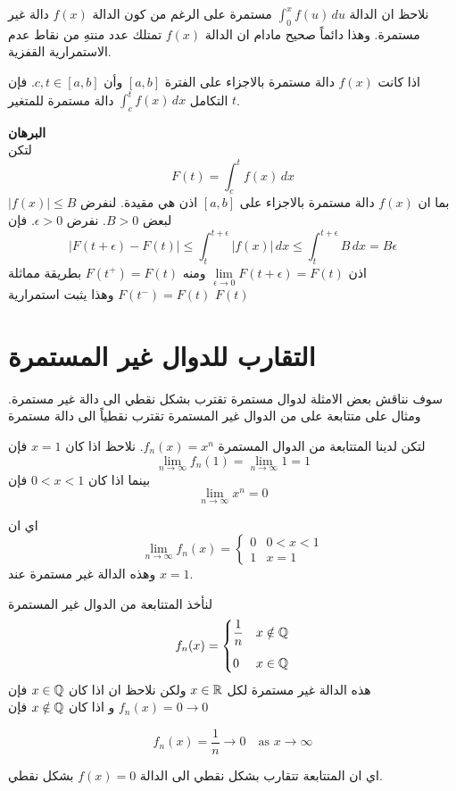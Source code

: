 \begin{note}
	نلاحظ ان الدالة $\int_{0}^{x} f(u)\, du$ مستمرة على الرغم من كون الدالة $f(x)$ دالة غير مستمرة. وهذا دائماً صحيح مادام ان الدالة $f(x)$ تمتلك عدد منتهِ من نقاط عدم الاستمرارية القفزية.
\end{note}

\begin{theorem}
	اذا كانت $f(x)$ دالة مستمرة  بالاجزاء على الفترة $[a, b]$ وأن $c,t\in [a,b]$. فإن التكامل
	 $\int_{c}^{t} f(x)\, dx$
	 دالة مستمرة للمتغير $t$. 
\end{theorem}
\noindent
\textbf{البرهان}\\
\noindent
لتكن
\[
F(t) = \int_{c}^{t} f(x)\, dx
\]
بما ان $f(x)$ دالة مستمرة بالاجزاء على $[a, b]$ اذن هي مقيدة. لنفرض $|f(x)| \leq B$ لبعض $B>0 $. نفرض $\epsilon > 0 $. فإن 
\[
|F(t+\epsilon) - F(t)| \leq \int_{t}^{t+\epsilon} |f(x)|\,dx \leq \int_{t}^{t+\epsilon} B\, dx=B\epsilon
\]
اذن 
$\lim\limits_{\epsilon\to0} F(t+\epsilon) = F(t)$ ومنه $F(t^+) = F(t)$ بطريقة مماثلة $F(t^-) =F(t)$ وهذا يثبت استمرارية $F(t)$


\section{التقارب للدوال غير المستمرة}
سوف نناقش بعض الامثلة لدوال مستمرة تقترب بشكل نقطي الى دالة غير مستمرة. ومثال على متتابعة على من الدوال غير المستمرة تقترب نقطياً الى دالة مستمرة

\begin{example}
	لتكن لدينا المتتابعة من الدوال المستمرة $f_n(x) = x^n$. نلاحظ اذا كان $x=1$ فإن
\[
\lim\limits_{n\to \infty} f_n(1) = \lim\limits_{n\to \infty} 1 =1
\]
	بينما اذا كان $0<x<1$ فإن 
	\[
	\lim\limits_{n\to \infty} x^n = 0
	\]
\end{example} 
اي ان 
\[
\lim\limits_{n\to \infty} f_n(x) = 
\begin{cases}
	0 & 0 <x< 1  \\
	1 & x=1
\end{cases}
\]
وهذه الدالة غير مستمرة عند $x=1$.

\begin{example}
	لنأخذ المتتابعة من الدوال غير المستمرة 
	\[
	f_n(x) = 
	\begin{cases}
		\dfrac{1}{n} & x\notin \mathbb{Q} \\[10pt]
		0 & x\in \mathbb{Q}
	\end{cases}
	\]
	هذه الدالة غير مستمرة لكل $x\in\mathbb{R}$ ولكن نلاحظ ان اذا كان $x\in\mathbb{Q}$ فإن 
	$f_n(x) = 0 \to 0$
	و اذا كان $x\notin \mathbb{Q}$ فإن 
	\begin{english}
		\[
	f_n(x) = \frac{1}{n} \to 0 \quad \text{as $x\to \infty$}
	\]
	\end{english}
	اي ان المتتابعة تتقارب بشكل نقطي الى الدالة $f(x) = 0 $ بشكل نقطي.
\end{example}
